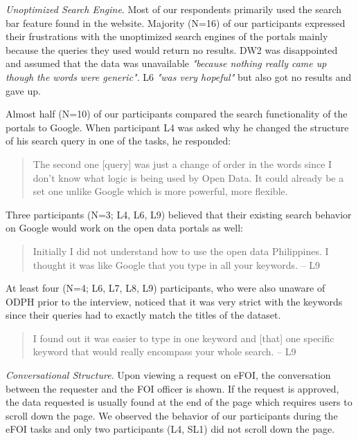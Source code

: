 \documentclass{sigchi}
\begin{document}
\textit{Unoptimized Search Engine}. Most of our respondents primarily used the search bar feature found in the website. Majority (N=16) of our participants expressed their frustrations with the unoptimized search engines of the portals mainly because the queries they used would return no results. DW2 was disappointed and assumed that the data was unavailable \textit{"because nothing really came up though the words were generic"}. L6 \textit{"was very hopeful"} but also got no results and gave up.


Almost half (N=10) of our participants compared the search functionality of the portals to Google. When participant L4 was asked why he changed the structure of his search query in one of the tasks, he responded:
\begin{quote}
The second one [query] was just a change of order in the words since I don't know what logic is being used by Open Data. It could already be a set one unlike Google which is more powerful, more flexible.
\end{quote}

Three participants (N=3; L4, L6, L9) believed that their existing search behavior on Google would work on the open data portals as well:
\begin{quote}
Initially I did not understand how to use the open data Philippines. I thought it was like Google that you type in all your keywords. -- L9
\end{quote}

At least four (N=4; L6, L7, L8, L9) participants, who were also unaware of ODPH prior to the interview, noticed that it was very strict with the keywords since their queries had to exactly match the titles of the dataset. 
\begin{quote}
I found out it was easier to type in one keyword and [that] one specific keyword that would really encompass your whole search. -- L9
\end{quote}

\textit{Conversational Structure}. Upon viewing a request on eFOI, the conversation between the requester and the FOI officer is shown. If the request is approved, the data requested is usually found at the end of the page which requires users to scroll down the page. We observed the behavior of our participants during the eFOI tasks and only two participants (L4, SL1) did not scroll down the page.
\end{document}
